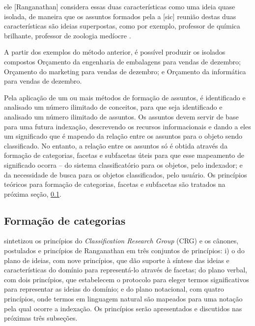 \begin{citacao}
ele [Ranganathan] considera essas duas características como uma ideia quase isolada, de maneira que os assuntos formados pela a [sic] reunião destas duas características são ideias superpostas, como por exemplo, professor de química brilhante, professor de zoologia medíocre \cite[p. 63-64]{lima04spiteri}. 
\end{citacao}

A partir dos exemplos do método anterior, é possível produzir os isolados compostos Orçamento da engenharia de embalagens para vendas de dezembro; Orçamento do marketing para vendas de dezembro; e Orçamento da informática para vendas de dezembro.

Pela aplicação de um ou mais métodos de formação de assuntos, é identificado e analisado um número ilimitado de conceitos, para que seja identificado e analisado um número ilimitado de assuntos. Os assuntos devem servir de base para uma futura indexação, descrevendo os recursos informacionais e dando a eles um significado que é mapeado da relação entre os assuntos para o objeto sendo classificado. No entanto, a relação entre os assuntos só é obtida através da formação de categorias, facetas e subfacetas úteis para que esse mapeamento de significado ocorra -- do sistema classificatório para os objetos, pelo indexador; e da necessidade de busca para os objetos classificados, pelo usuário. Os princípios teóricos para formação de categorias, facetas e subfacetas são tratados na próxima seção, \ref{formacaoCategorias}.


\subsection{Formação de categorias}
\label{formacaoCategorias}

 sintetizou os princípios do \textit{Classification Research Group} (CRG) e os cânones, postulados e princípios de Ranganathan em três conjuntos de princípios: i) o do plano de ideias, com nove princípios, que dão suporte à síntese das ideias e características do domínio para representá-lo através de facetas; do plano verbal, com dois princípios, que estabelecem o protocolo para eleger termos significativos para representar as ideias do domínio; e do plano notacional, com quatro princípios, onde termos em linguagem natural são mapeados para uma notação pela qual ocorre a indexação. Os princípios serão apresentados e discutidos nas próximas três subseções.

